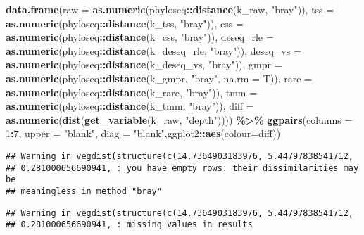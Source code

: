 \documentclass[
]{book}
\newenvironment{Shaded}{\begin{snugshade}}{\end{snugshade}}
\newcommand{\DataTypeTok}[1]{\textcolor[rgb]{0.13,0.29,0.53}{#1}}
\newcommand{\DecValTok}[1]{\textcolor[rgb]{0.00,0.00,0.81}{#1}}
\newcommand{\KeywordTok}[1]{\textcolor[rgb]{0.13,0.29,0.53}{\textbf{#1}}}
\newcommand{\NormalTok}[1]{#1}
\newcommand{\OperatorTok}[1]{\textcolor[rgb]{0.81,0.36,0.00}{\textbf{#1}}}
\newcommand{\StringTok}[1]{\textcolor[rgb]{0.31,0.60,0.02}{#1}}
\begin{document}
\begin{Shaded}
\begin{Highlighting}[]
\KeywordTok{data.frame}\NormalTok{(}\DataTypeTok{raw =} \KeywordTok{as.numeric}\NormalTok{(phyloseq}\OperatorTok{::}\KeywordTok{distance}\NormalTok{(k\_raw, }\StringTok{"bray"}\NormalTok{)), }
           \DataTypeTok{tss =} \KeywordTok{as.numeric}\NormalTok{(phyloseq}\OperatorTok{::}\KeywordTok{distance}\NormalTok{(k\_tss, }\StringTok{"bray"}\NormalTok{)), }
           \DataTypeTok{css =} \KeywordTok{as.numeric}\NormalTok{(phyloseq}\OperatorTok{::}\KeywordTok{distance}\NormalTok{(k\_css, }\StringTok{"bray"}\NormalTok{)),}
           \DataTypeTok{deseq\_rle =} \KeywordTok{as.numeric}\NormalTok{(phyloseq}\OperatorTok{::}\KeywordTok{distance}\NormalTok{(k\_deseq\_rle, }\StringTok{"bray"}\NormalTok{)),}
           \DataTypeTok{deseq\_vs =} \KeywordTok{as.numeric}\NormalTok{(phyloseq}\OperatorTok{::}\KeywordTok{distance}\NormalTok{(k\_deseq\_vs, }\StringTok{"bray"}\NormalTok{)),}
           \DataTypeTok{gmpr =} \KeywordTok{as.numeric}\NormalTok{(phyloseq}\OperatorTok{::}\KeywordTok{distance}\NormalTok{(k\_gmpr, }\StringTok{"bray"}\NormalTok{, }\DataTypeTok{na.rm =}\NormalTok{ T)),}
           \DataTypeTok{rare =} \KeywordTok{as.numeric}\NormalTok{(phyloseq}\OperatorTok{::}\KeywordTok{distance}\NormalTok{(k\_rare, }\StringTok{"bray"}\NormalTok{)),}
           \DataTypeTok{tmm =} \KeywordTok{as.numeric}\NormalTok{(phyloseq}\OperatorTok{::}\KeywordTok{distance}\NormalTok{(k\_tmm, }\StringTok{"bray"}\NormalTok{)),}
           \DataTypeTok{diff =} \KeywordTok{as.numeric}\NormalTok{(}\KeywordTok{dist}\NormalTok{(}\KeywordTok{get\_variable}\NormalTok{(k\_raw, }\StringTok{"depth"}\NormalTok{)))) }\OperatorTok{\%\textgreater{}\%}\StringTok{ }
\StringTok{    }\KeywordTok{ggpairs}\NormalTok{(}\DataTypeTok{columns =} \DecValTok{1}\OperatorTok{:}\DecValTok{7}\NormalTok{, }\DataTypeTok{upper =} \StringTok{"blank"}\NormalTok{,}
            \DataTypeTok{diag =} \StringTok{"blank"}\NormalTok{,ggplot2}\OperatorTok{::}\KeywordTok{aes}\NormalTok{(}\DataTypeTok{colour=}\NormalTok{diff))}
\end{Highlighting}
\end{Shaded}

\begin{verbatim}
## Warning in vegdist(structure(c(14.7364903183976, 5.44797838541712,
## 0.281000656690941, : you have empty rows: their dissimilarities may be
## meaningless in method "bray"
\end{verbatim}

\begin{verbatim}
## Warning in vegdist(structure(c(14.7364903183976, 5.44797838541712,
## 0.281000656690941, : missing values in results
\end{verbatim}
\end{document}
